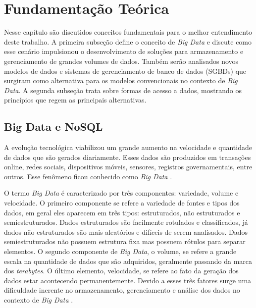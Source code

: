 
\chapter{Fundamentação Teórica}
\label{chap:fundamentacaoTeorica}

Nesse capítulo são discutidos conceitos fundamentais para o melhor entendimento deste 
trabalho. A primeira subseção define o conceito de \textit{Big Data} e discute como esse 
cenário impulsionou o desenvolvimento de soluções para armazenamento e gerenciamento de 
grandes volumes de dados. Também serão analisados novos modelos de dados e sistemas de 
gerenciamento de banco de dados (SGBDs) que surgiram como alternativa para os modelos 
convencionais no contexto de \textit{Big Data}. A segunda subseção trata sobre formas de 
acesso a dados, mostrando os princípios que regem as principais alternativas.

\section{Big Data e NoSQL}
\label{sec:bigdata}

A evolução tecnológica viabilizou um grande aumento na velocidade e quantidade de dados que 
são gerados diariamente. Esses dados são produzidos em transações online, redes sociais, 
dispositivos móveis, sensores, registros governamentais, entre outros. Esse fenômeno ficou 
conhecido como \textit{Big Data} \cite{sagiroglu2013big}. 

O termo \textit{Big Data} é caracterizado por três componentes: variedade, volume e velocidade. 
O primeiro componente se refere a variedade de fontes e tipos dos dados, em geral eles 
aparecem em três tipos: estruturados, não estruturados e semiestruturados. Dados estruturados 
são facilmente rotulados e classificados, já dados não estruturados são mais aleatórios e 
difíceis de serem analisados. Dados semiestruturados não possuem estrutura fixa mas possuem 
rótulos para separar elementos. O segundo componente de \textit{Big Data}, o volume, se 
refere a grande escala na quantidade de dados que são adquiridos, geralmente passando da 
marca dos \textit{terabytes}. O último elemento, velocidade, se refere ao fato da geração 
dos dados estar acontecendo permanentemente. Devido a esses três fatores surge uma 
dificuldade inerente no armazenamento, gerenciamento e análise dos dados no contexto de 
\textit{Big Data} \cite{sagiroglu2013big}.


